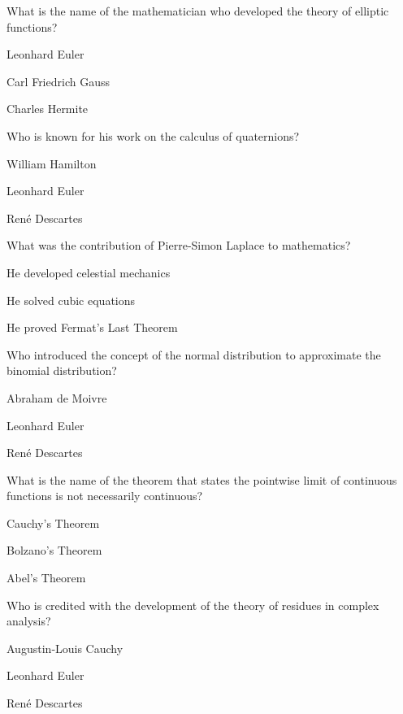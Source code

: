 \begin{enhancedmcq}{What is the name of the mathematician who developed the theory of elliptic functions?}
\item Leonhard Euler
\item Carl Friedrich Gauss
\item Charles Hermite

\end{enhancedmcq}
\begin{enhancedmcq}{Who is known for his work on the calculus of quaternions?}
\item William Hamilton
\item Leonhard Euler
\item René Descartes

\end{enhancedmcq}
\begin{enhancedmcq}{What was the contribution of Pierre‑Simon Laplace to mathematics?}
\item He developed celestial mechanics
\item He solved cubic equations
\item He proved Fermat's Last Theorem

\end{enhancedmcq}
\begin{enhancedmcq}{Who introduced the concept of the normal distribution to approximate the binomial distribution?}
\item Abraham de Moivre
\item Leonhard Euler
\item René Descartes

\end{enhancedmcq}
\begin{enhancedmcq}{What is the name of the theorem that states the pointwise limit of continuous functions is not necessarily continuous?}
\item Cauchy's Theorem
\item Bolzano's Theorem
\item Abel's Theorem

\end{enhancedmcq}
\begin{enhancedmcq}{Who is credited with the development of the theory of residues in complex analysis?}
\item Augustin‑Louis Cauchy
\item Leonhard Euler
\item René Descartes

\end{enhancedmcq}

